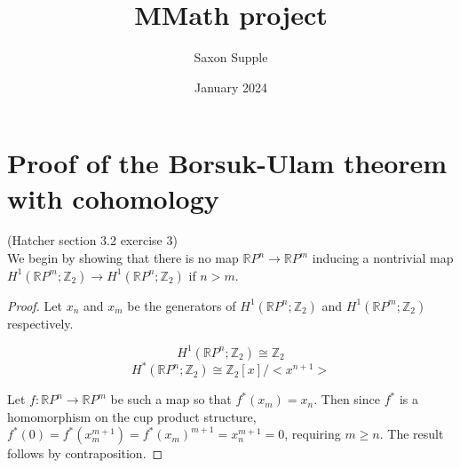 \documentclass{article}
\title{MMath project}
\author{Saxon Supple }
\date{January 2024}
\begin{document}
\maketitle

\section{Proof of the Borsuk-Ulam theorem with cohomology}

\textrm{(Hatcher section 3.2 exercise 3) \\}
We begin by showing that there is no map
$\mathbb{R} P^n$$\rightarrow$$\mathbb{R} P^m$ inducing a nontrivial map $H^1(\mathbb{R} P^m;\mathbb{Z}_2)\rightarrow H^1(\mathbb{R} P^n;\mathbb{Z}_2)$ if $n>m$.

\begin{proof}
Let $x_n$ and $x_m$ be the generators of $H^1(\mathbb{R} P^n;\mathbb{Z}_2)$ and $H^1(\mathbb{R} P^m;\mathbb{Z}_2)$ respectively.

\[H^1(\mathbb{R} P^n;\mathbb{Z}_2)\cong \mathbb{Z}_2\] 
\[H^*(\mathbb{R} P^n;\mathbb{Z}_2)\cong \mathbb{Z}_2[x]/<x^{n+1}>\] 

Let $f:\mathbb{R} P^n\rightarrow\mathbb{R} P^m $ be such a map so that $f^*(x_m)=x_n$.
Then since $f^*$ is a homomorphism on the cup product structure, $f^*(0)=f^*(x_m^{m+1})=f^*(x_m)^{m+1}=x_n^{m+1}=0$, requiring $m \geq n$. The result follows by contraposition.
\end{proof}
\end{document}
